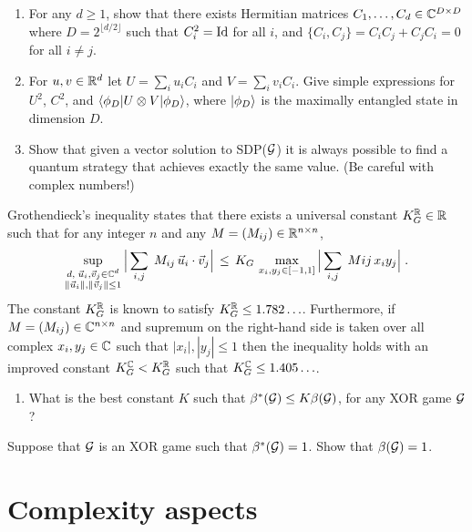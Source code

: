 \begin{exercise}\label{ex:tsirelson}
\begin{enumerate}
\item For any $d\geq 1$, show that there exists Hermitian matrices $C_1,\ldots,C_d \in \mathbb{C}^{D\times D}$ where $D=2^{\lfloor d/2\rfloor}$ such that $C_i^2=\mathop{\rm Id}\nolimits$ for all $i$, and $\{C_i,C_j\}=C_iC_j+C_jC_i=0$ for all $i\neq j$.
\item For $u,v \in \mathbb{R}^d$ let $U = \sum_i u_i C_i$ and $V=\sum_i v_i C_i$. Give simple expressions for $U^2$, $C^2$, and $\langle\phi_D| U\otimes V |\phi_D\rangle$, where $|\phi_D\rangle$ is the maximally entangled state in dimension $D$.
\item Show that given a vector solution to SDP($\mathcal{G}$) it is always possible to find a quantum strategy that achieves exactly the same value. (Be careful with complex numbers!)
\end{enumerate}
\end{exercise}

\begin{exercise}
Grothendieck's inequality states that there exists a universal constant $K_G^{\mathbb{R}}\in\mathbb{R}$ such that for any integer $n$ and any $M=(M_{ij})\in \mathbb{R}^{n\times n}$, 
\[\sup_{\substack{d,\;\vec{u}_i,\vec{v}_j\in \mathbb{C}^{d}\\ \|\vec{u}_i\|,\|\vec{v}_j\|\leq 1}} \Big|\sum_{i,j} \; M_{ij}\, \vec{u}_i\cdot \vec{v}_j \Big|\,\leq\, K_G\, \max_{x_i,y_j\in [-1,1]} \Big|\sum_{i,j} \; M{ij}\, x_i y_j \Big|\;.\]
The constant $K_G^{\mathbb{R}}$ is known to satisfy $K_G^{\mathbb{R}} \leq 1.782\ldots$.
Furthermore, if $M=(M_{ij})\in \mathbb{C}^{n\times n}$ and supremum on the right-hand side is taken over all complex $x_i,y_j\in \mathbb{C}$ such that $|x_i|,|y_j|\leq 1$ then the inequality holds with an improved constant $K_G^{\mathbb{C}} < K_G^{\mathbb{R}}$ such that $K_G^{\mathbb{C}} \leq 1.405\ldots$.
\begin{enumerate}
\item What is the best constant $K$ such that $\beta^*(\mathcal{G}) \leq K \beta(\mathcal{G})$, for any XOR game $\mathcal{G}$?
\end{enumerate}
\end{exercise}



\begin{exercise}
Suppose that $\mathcal{G}$ is an XOR game such that $\beta^*(\mathcal{G})=1$. Show that $\beta(\mathcal{G})=1$. 
\end{exercise}

\section{Complexity aspects}

